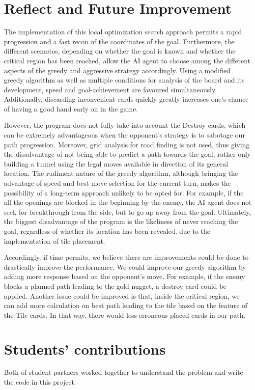 \documentclass[12pt,twoside,letterpaper]{article}
\begin{document}
\section{Reflect and Future Improvement}
The implementation of this local optimization search approach permits a rapid progression and a fast recon of the coordinates of the goal. Furthermore, the different scenarios, depending on whether the goal is known and whether the critical region has been reached, allow the AI agent to choose among the different aspects of the greedy and aggressive strategy accordingly. Using a modified greedy algorithm as well as multiple conditions for analysis of the board and its development, speed and goal-achievement are favoured simultaneously. Additionally, discarding inconvenient cards quickly greatly increases one's chance of having a good hand early on in the game.
\par However, the program does not fully take into account the Destroy cards, which can be extremely advantageous when the opponent's strategy is to sabotage our path progression. Moreover, grid analysis for road finding is not used, thus giving the disadvantage of not being able to predict a path towards the goal, rather only building a tunnel using the legal moves available in direction of its general location. The rudiment nature of the greedy algorithm, although bringing the advantage of speed and best move selection for the current turn, makes the possibility of a long-term approach unlikely to be opted for. For example, if the all the openings are blocked in the beginning by the enemy, the AI agent does not seek for breakthrough from the side, but to go up away from the goal. Ultimately, the biggest disadvantage of the program is the likeliness of never reaching the goal, regardless of whether its location has been revealed, due to the implementation of tile placement.
\par Accordingly, if time permits, we believe there are improvements could be done to drastically improve the performance. We could improve our greedy algorithm by adding more response based on the opponent's move. For example, if the enemy blocks a planned path leading to the gold nugget, a destroy card could be applied. Another issue could be improved is that, inside the critical region, we can add more calculation on best path leading to the tile based on the feature of the Tile cards. In that way, there would less erroneous placed cards in our path.

\vfill
\section*{Students' contributions}
Both of student partners worked together to understand the problem and write the code in this project.
\end{document}
